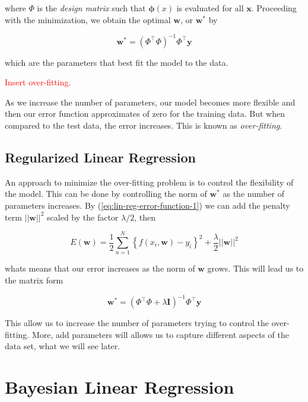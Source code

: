 \documentclass[11pt]{article} %
\begin{document}
where $\Phi$ is the \textit{design matrix} such that $\boldsymbol{\phi}(x)$ is evaluated for all $\mathbf{x}$. Proceeding with the minimization, we obtain the optimal $\mathbf{w}$, or $\mathbf{w}^*$ by

\begin{equation}
   \label{eq:lin-reg-opt-param}
   \mathbf{w}^{*} = (\Phi^\top \Phi)^{-1}\Phi^\top \mathbf{y}
\end{equation}

which are the parameters that best fit the model to the data.

\textcolor{red}{Insert over-fitting.}

As we increase the number of parameters, our model becomes more flexible and then our error function approximates of zero for the training data. But when compared to the test data, the error increases. This is known as \textit{over-fitting}.

\subsection{Regularized Linear Regression}

An approach to minimize the over-fitting problem is to control the flexibility of the model. This can be done by controlling the norm of $\mathbf{w}^*$ as the number of parameters increases. By (\ref{eq:lin-reg-error-function-1}) we can add the penalty term $||\mathbf{w}||^2 $ scaled by the factor $\lambda / 2$, then

\begin{equation}
   \label{eq:lin-reg-error-function-regularized}
   E(\mathbf{w}) = \frac{1}{2} \sum_{n=1}^N \left\{ f(x_i,\mathbf{w})-y_i \right\}^2 + \frac{\lambda}{2} ||\mathbf{w}||^2
\end{equation}

whats means that our error increases as the norm of $\mathbf{w}$ grows. This will lead us to the matrix form

\begin{equation}
   \label{eq:lin-reg-error-function-regularized-matrix-form}
   \mathbf{w}^{*} = (\Phi^\top \Phi + \lambda \mathbf{I})^{-1}\Phi^\top \mathbf{y} 
\end{equation}

This allow us to increase the number of parameters trying to control the over-fitting. More, add parameters will allows us to capture different aspects of the data set, what we will see later.

\section{Bayesian Linear Regression}
\end{document}
